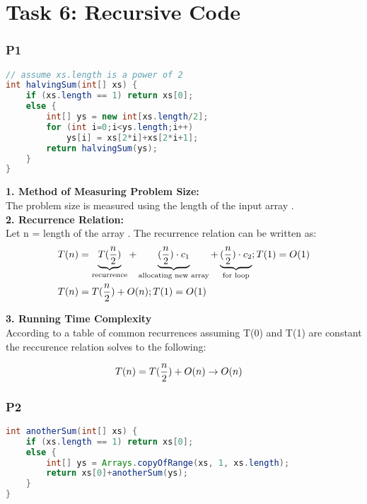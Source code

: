 \chapter{Task 6: Recursive Code}

\subsection*{P1}
\begin{lstlisting}[language=Java]
// assume xs.length is a power of 2
int halvingSum(int[] xs) {
    if (xs.length == 1) return xs[0];
    else {
        int[] ys = new int[xs.length/2];
        for (int i=0;i<ys.length;i++)
            ys[i] = xs[2*i]+xs[2*i+1];
        return halvingSum(ys);
    }
}
\end{lstlisting}
\vspace*{4pt}

\textbf{1. Method of Measuring Problem Size:}\\ 
The problem size is measured using the length of the input array .
\\
    
\textbf{2. Recurrence Relation:}\\ 
Let n = length of the array . The recurrence relation can be written as:
\begin{align*}
 T(n) &=  \underbrace{T({n\over2})}_{\text{recurrence}} +
\underbrace{({n\over2})\cdot c_1}_{\text{allocating new array}} +
\underbrace{({n\over2})\cdot c_2}_{\text{for loop}}
; T(1) = O(1)\\
T(n) &=  T({n\over2}) +O(n)
 ; T(1) = O(1)\\
\end{align*}

\textbf{3. Running Time Complexity}\\ 
According to a table of common recurrences assuming T(0) and T(1) are constant the reccurence relation solves to the following:

\begin{align*}
    T(n) &= T({n\over2}) +O(n) \rightarrow O(n) 
\end{align*}

\pagebreak

\subsection*{P2}
\begin{lstlisting}[language=Java]
int anotherSum(int[] xs) {
    if (xs.length == 1) return xs[0];
    else {
        int[] ys = Arrays.copyOfRange(xs, 1, xs.length);
        return xs[0]+anotherSum(ys);
    }
}
\end{lstlisting}

